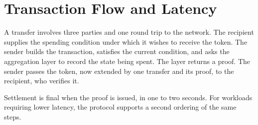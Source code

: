 \section{Transaction Flow and Latency}

A transfer involves three parties and one round trip to the network. The recipient supplies the spending condition under which it wishes to receive the token. The sender builds the transaction, satisfies the current condition, and asks the aggregation layer to record the state being spent. The layer returns a proof. The sender passes the token, now extended by one transfer and its proof, to the recipient, who verifies it.

Settlement is final when the proof is issued, in one to two seconds. For workloads requiring lower latency, the protocol supports a second ordering of the same steps.

